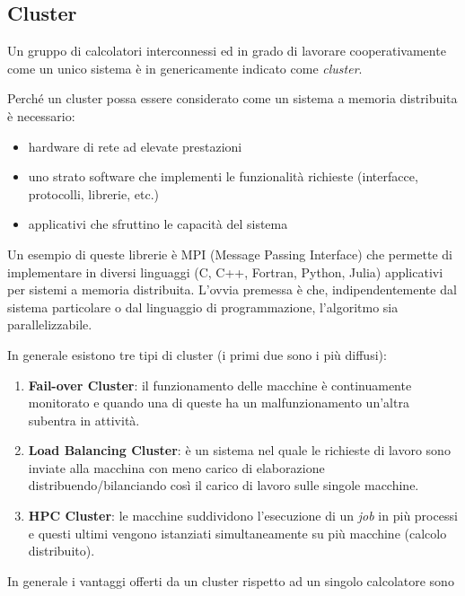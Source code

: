 \documentclass[italian,]{article}
\providecommand{\tightlist}{%
  \setlength{\itemsep}{0pt}\setlength{\parskip}{0pt}}
\begin{document}
\subsection{Cluster}\label{cluster}

Un gruppo di calcolatori interconnessi ed in grado di lavorare
cooperativamente come un unico sistema è in genericamente indicato come
\emph{cluster}.

Perché un cluster possa essere considerato come un sistema a memoria
distribuita è necessario:

\begin{itemize}
\tightlist
\item
  hardware di rete ad elevate prestazioni
\item
  uno strato software che implementi le funzionalità richieste
  (interfacce, protocolli, librerie, etc.)
\item
  applicativi che sfruttino le capacità del sistema
\end{itemize}

Un esempio di queste librerie è MPI (Message Passing Interface) che
permette di implementare in diversi linguaggi (C, C++, Fortran, Python,
Julia) applicativi per sistemi a memoria distribuita. L'ovvia premessa è
che, indipendentemente dal sistema particolare o dal linguaggio di
programmazione, l'algoritmo sia parallelizzabile.

In generale esistono tre tipi di cluster (i primi due sono i più
diffusi):

\begin{enumerate}
\def\labelenumi{\arabic{enumi}.}
\tightlist
\item
  \textbf{Fail-over Cluster}: il funzionamento delle macchine è
  continuamente monitorato e quando una di queste ha un malfunzionamento
  un'altra subentra in attività.
\item
  \textbf{Load Balancing Cluster}: è un sistema nel quale le richieste
  di lavoro sono inviate alla macchina con meno carico di elaborazione
  distribuendo/bilanciando così il carico di lavoro sulle singole
  macchine.
\item
  \textbf{HPC Cluster}: le macchine suddividono l'esecuzione di un
  \emph{job} in più processi e questi ultimi vengono istanziati
  simultaneamente su più macchine (calcolo distribuito).
\end{enumerate}

In generale i vantaggi offerti da un cluster rispetto ad un singolo
calcolatore sono
\end{document}
